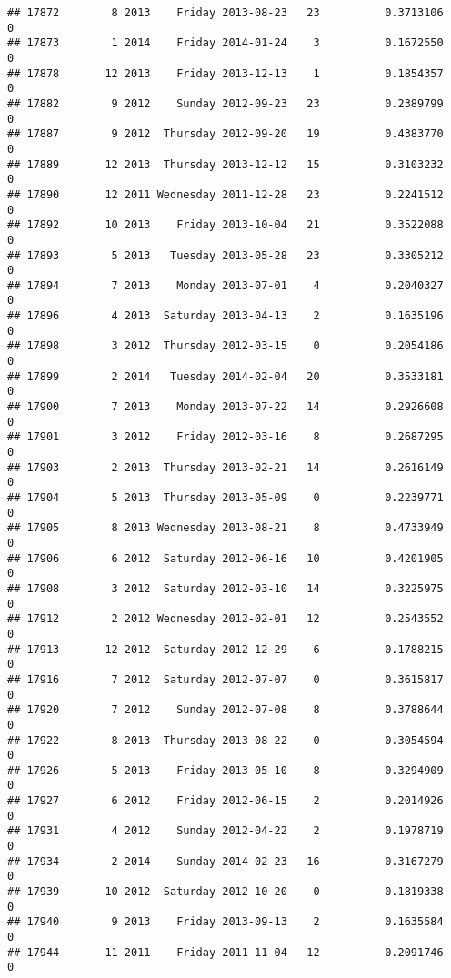 \documentclass[
]{article}
\begin{document}
\begin{verbatim}
## 17872        8 2013    Friday 2013-08-23   23          0.3713106             0
## 17873        1 2014    Friday 2014-01-24    3          0.1672550             0
## 17878       12 2013    Friday 2013-12-13    1          0.1854357             0
## 17882        9 2012    Sunday 2012-09-23   23          0.2389799             0
## 17887        9 2012  Thursday 2012-09-20   19          0.4383770             0
## 17889       12 2013  Thursday 2013-12-12   15          0.3103232             0
## 17890       12 2011 Wednesday 2011-12-28   23          0.2241512             0
## 17892       10 2013    Friday 2013-10-04   21          0.3522088             0
## 17893        5 2013   Tuesday 2013-05-28   23          0.3305212             0
## 17894        7 2013    Monday 2013-07-01    4          0.2040327             0
## 17896        4 2013  Saturday 2013-04-13    2          0.1635196             0
## 17898        3 2012  Thursday 2012-03-15    0          0.2054186             0
## 17899        2 2014   Tuesday 2014-02-04   20          0.3533181             0
## 17900        7 2013    Monday 2013-07-22   14          0.2926608             0
## 17901        3 2012    Friday 2012-03-16    8          0.2687295             0
## 17903        2 2013  Thursday 2013-02-21   14          0.2616149             0
## 17904        5 2013  Thursday 2013-05-09    0          0.2239771             0
## 17905        8 2013 Wednesday 2013-08-21    8          0.4733949             0
## 17906        6 2012  Saturday 2012-06-16   10          0.4201905             0
## 17908        3 2012  Saturday 2012-03-10   14          0.3225975             0
## 17912        2 2012 Wednesday 2012-02-01   12          0.2543552             0
## 17913       12 2012  Saturday 2012-12-29    6          0.1788215             0
## 17916        7 2012  Saturday 2012-07-07    0          0.3615817             0
## 17920        7 2012    Sunday 2012-07-08    8          0.3788644             0
## 17922        8 2013  Thursday 2013-08-22    0          0.3054594             0
## 17926        5 2013    Friday 2013-05-10    8          0.3294909             0
## 17927        6 2012    Friday 2012-06-15    2          0.2014926             0
## 17931        4 2012    Sunday 2012-04-22    2          0.1978719             0
## 17934        2 2014    Sunday 2014-02-23   16          0.3167279             0
## 17939       10 2012  Saturday 2012-10-20    0          0.1819338             0
## 17940        9 2013    Friday 2013-09-13    2          0.1635584             0
## 17944       11 2011    Friday 2011-11-04   12          0.2091746             0

\end{verbatim}
\end{document}
